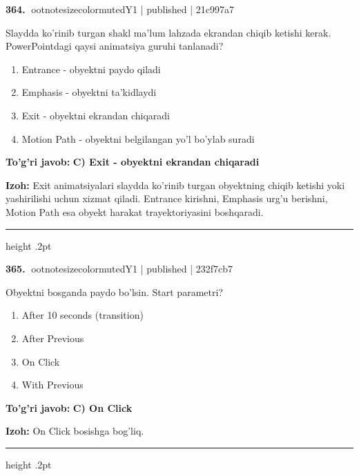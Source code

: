 \documentclass[10pt,a4paper]{article}
\begin{document}
\textbf{\color{ink}364.} {ootnotesizecolor{muted}Y1 | published | 21c997a7}
\par
Slaydda ko'rinib turgan shakl ma'lum lahzada ekrandan chiqib ketishi kerak. PowerPointdagi qaysi animatsiya guruhi tanlanadi?
\begin{enumerate}[label=\Alph*),leftmargin=9mm]
\item Entrance - obyektni paydo qiladi
\item Emphasis - obyektni ta'kidlaydi
\item Exit - obyektni ekrandan chiqaradi
\item Motion Path - obyektni belgilangan yo'l bo'ylab suradi
\end{enumerate}
\begin{tcolorbox}[enhanced,breakable,colback=teal!4,colframe=teal!55!black,boxrule=0.45pt,arc=1.2mm,left=2.8mm,right=2.8mm,top=2mm,bottom=2mm]
\textbf{\color{teal}To'g'ri javob:} \textbf{C) Exit - obyektni ekrandan chiqaradi}
\par\smallskip
\textbf{Izoh:} Exit animatsiyalari slaydda ko'rinib turgan obyektning chiqib ketishi yoki yashirilishi uchun xizmat qiladi. Entrance kirishni, Emphasis urg'u berishni, Motion Path esa obyekt harakat trayektoriyasini boshqaradi.
\end{tcolorbox}
\vspace{2mm}\hrule height .2pt\vspace{2mm}

\textbf{\color{ink}365.} {ootnotesizecolor{muted}Y1 | published | 232f7cb7}
\par
Obyektni bosganda paydo bo'lsin. Start parametri?
\begin{enumerate}[label=\Alph*),leftmargin=9mm]
\item After 10 seconds (transition)
\item After Previous
\item On Click
\item With Previous
\end{enumerate}
\begin{tcolorbox}[enhanced,breakable,colback=teal!4,colframe=teal!55!black,boxrule=0.45pt,arc=1.2mm,left=2.8mm,right=2.8mm,top=2mm,bottom=2mm]
\textbf{\color{teal}To'g'ri javob:} \textbf{C) On Click}
\par\smallskip
\textbf{Izoh:} On Click bosishga bog'liq.
\end{tcolorbox}
\vspace{2mm}\hrule height .2pt\vspace{2mm}
\end{document}
